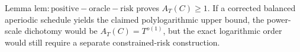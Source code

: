 Lemma \(\mathrm{lem:positive-oracle-risk}\) proves \(A_T(C)\ge1\). If a corrected balanced aperiodic schedule yields the claimed polylogarithmic upper bound, the power-scale dichotomy would be \(A_T(C)=T^{o(1)}\), but the exact logarithmic order would still require a separate constrained-risk construction.